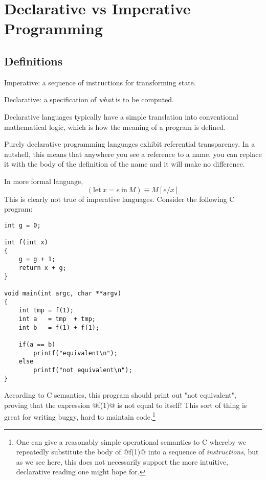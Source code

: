 
\chapter{Declarative vs Imperative Programming}

\section{Definitions}

\begin{description}
\item{Imperative:} a sequence of instructions for transforming state.
\item{Declarative:} a specification of \emph{what} is to be computed.
\end{description}

Declarative languages typically have a simple translation into
conventional mathematical logic, which is how the meaning of a program
is defined.

Purely declarative programming languages exhibit referential
transparency.  In a nutshell, this means that anywhere you see a
reference to a name, you can replace it with the body of the
definition of the name and it will make no difference.

In more formal language,
\[
(\text{let}\ x = e\ \text{in}\ M)  \equiv  M[e/x]
\]
This is clearly not true of imperative languages.  Consider
the following C program:

\begin{verbatim}
int g = 0;

int f(int x)
{
    g = g + 1;
    return x + g;
}

void main(int argc, char **argv)
{
    int tmp = f(1);
    int a   = tmp  + tmp;
    int b   = f(1) + f(1);

    if(a == b)
        printf("equivalent\n");
    else
        printf("not equivalent\n");
}
\end{verbatim}

According to C semantics, this program should print out "not
equivalent", proving that the expression @f(1)@ is not equal to
itself!  This sort of thing is great for writing buggy, hard to
maintain code.\footnote{One can give a reasonably simple
operational semantics to C whereby we repeatedly substitute the
body of @f(1)@ into a sequence of \emph{instructions}, but as we
see here, this does not necessarily support the more intuitive,
declarative reading one might hope for.}

